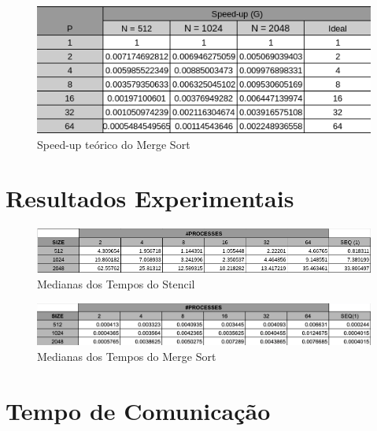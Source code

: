 \documentclass{article}
\begin{document}
\begin{appendix}
\begin{figure}[H]
    \centering
    \includegraphics[width=15cm]{Pictures/TheoreticalTbl2.png}
    \caption{Speed-up teórico do Merge Sort}
\end{figure}

\section{Resultados Experimentais}

\begin{figure}[H]
    \centering
    \includegraphics[width=19cm]{Pictures/ExperimentalTable1.png}
    \caption{Medianas dos Tempos do Stencil}
    \label{resStencil}
\end{figure}

\begin{figure}[H]
    \centering
    \includegraphics[width=19cm]{Pictures/ExperimentalTable2.png}
    \caption{Medianas dos Tempos do Merge Sort}
    \label{resMergeSort}
\end{figure}

\section{Tempo de Comunicação}


\end{appendix}
\end{document}
